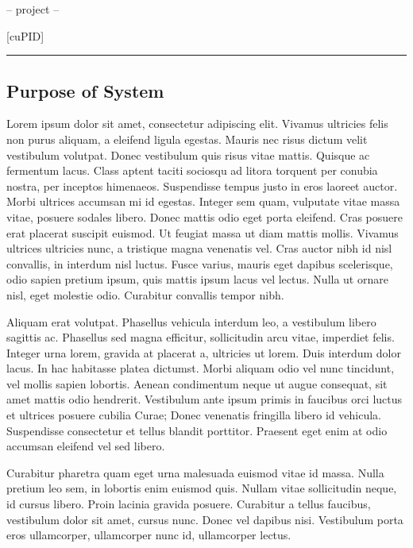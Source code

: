 \documentclass[12pt,letterpaper]{article}
\begin{document}
\begin{center}
-- project --
\end{center}

\begin{center}
{\Huge [cuPID]}
\end{center}

\begin{center}
\rule{0.85\textwidth}{0.5pt}
\end{center}

\subsection{Purpose of System}

Lorem ipsum dolor sit amet, consectetur adipiscing elit.
Vivamus ultricies felis non purus aliquam, a eleifend ligula egestas.
Mauris nec risus dictum velit vestibulum volutpat. Donec vestibulum
quis risus vitae mattis. Quisque ac fermentum lacus. Class aptent
taciti sociosqu ad litora torquent per conubia nostra, per inceptos
himenaeos. Suspendisse tempus justo in eros laoreet auctor. Morbi
ultrices accumsan mi id egestas. Integer sem quam, vulputate vitae
massa vitae, posuere sodales libero. Donec mattis odio eget porta
eleifend. Cras posuere erat placerat suscipit euismod. Ut feugiat
massa ut diam mattis mollis. Vivamus ultrices ultricies nunc, a tristique
magna venenatis vel. Cras auctor nibh id nisl convallis, in interdum
nisl luctus. Fusce varius, mauris eget dapibus scelerisque, odio sapien
pretium ipsum, quis mattis ipsum lacus vel lectus. Nulla ut ornare
nisl, eget molestie odio. Curabitur convallis tempor nibh.

Aliquam erat volutpat. Phasellus vehicula interdum leo, a
vestibulum libero sagittis ac. Phasellus sed magna efficitur, sollicitudin
arcu vitae, imperdiet felis. Integer urna lorem, gravida at placerat
a, ultricies ut lorem. Duis interdum dolor lacus. In hac habitasse
platea dictumst. Morbi aliquam odio vel nunc tincidunt, vel mollis
sapien lobortis. Aenean condimentum neque ut augue consequat, sit
amet mattis odio hendrerit. Vestibulum ante ipsum primis in faucibus
orci luctus et ultrices posuere cubilia Curae; Donec venenatis fringilla
libero id vehicula. Suspendisse consectetur et tellus blandit porttitor.
Praesent eget enim at odio accumsan eleifend vel sed libero.

Curabitur pharetra quam eget urna malesuada euismod vitae
id massa. Nulla pretium leo sem, in lobortis enim euismod quis. Nullam
vitae sollicitudin neque, id cursus libero. Proin lacinia gravida
posuere. Curabitur a tellus faucibus, vestibulum dolor sit amet, cursus
nunc. Donec vel dapibus nisi. Vestibulum porta eros ullamcorper,
ullamcorper nunc id, ullamcorper lectus.
\end{document}
